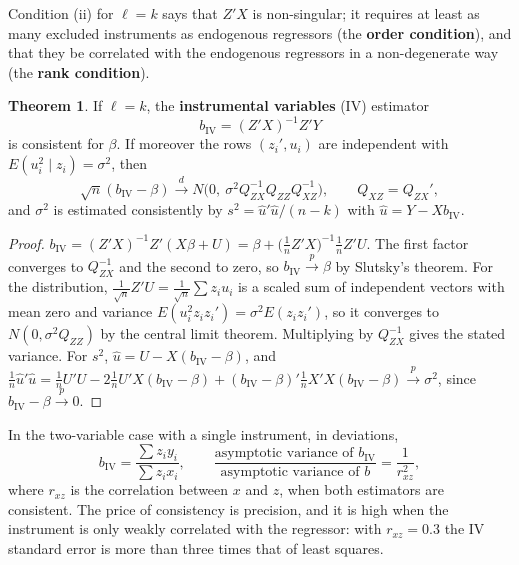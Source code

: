 \documentclass[11pt,a4paper]{article}
\numberwithin{equation}{section}
\theoremstyle{definition}
\newtheorem{thm}{Theorem}[subsection]
\begin{document}
Condition (ii) for $\ell = k$ says that $Z'X$ is non-singular; it requires at least as many excluded instruments as endogenous regressors (the
\textbf{order condition}), and that they be correlated with the endogenous regressors in a non-degenerate way (the \textbf{rank condition}).

\begin{thm}
\label{thm:ivest}
If $\ell = k$, the \textbf{instrumental variables} (IV) estimator
\[
b_{\text{IV}} = (Z'X)^{-1}Z'Y
\]
is consistent for $\beta$. If moreover the rows $(z_i', u_i)$ are independent with $E(u_i^2 \mid z_i) = \sigma^2$, then
\[
\sqrt n(b_{\text{IV}} - \beta) \xrightarrow{d} N\bigl(0,\ \sigma^2Q_{ZX}^{-1}Q_{ZZ}Q_{XZ}^{-1}\bigr), \qquad Q_{XZ} = Q_{ZX}' ,
\]
and $\sigma^2$ is estimated consistently by $s^2 = \hat u'\hat u/(n - k)$ with $\hat u = Y - Xb_{\text{IV}}$.
\end{thm}

\begin{proof}
$b_{\text{IV}} = (Z'X)^{-1}Z'(X\beta + U) = \beta + \bigl(\frac1nZ'X\bigr)^{-1}\frac1nZ'U$. The first factor converges to $Q_{ZX}^{-1}$ and the second to zero, so $b_{\text{IV}} \xrightarrow{p} \beta$
by Slutsky's theorem. For the distribution, $\frac{1}{\sqrt n}Z'U = \frac{1}{\sqrt n}\sum z_iu_i$ is a scaled sum of independent vectors with mean zero and variance
$E(u_i^2z_iz_i') = \sigma^2E(z_iz_i')$, so it converges to $N(0, \sigma^2Q_{ZZ})$ by the central limit theorem. Multiplying by $Q_{ZX}^{-1}$ gives the stated variance. For $s^2$,
$\hat u = U - X(b_{\text{IV}} - \beta)$, and $\frac1n\hat u'\hat u = \frac1nU'U - 2\frac1nU'X(b_{\text{IV}} - \beta) + (b_{\text{IV}} - \beta)'\frac1nX'X(b_{\text{IV}} - \beta) \xrightarrow{p} \sigma^2$, since $b_{\text{IV}} - \beta \xrightarrow{p} 0$.
\end{proof}

In the two-variable case with a single instrument, in deviations,
\[
b_{\text{IV}} = \frac{\sum z_iy_i}{\sum z_ix_i}, \qquad \frac{\text{asymptotic variance of } b_{\text{IV}}}{\text{asymptotic variance of } b} = \frac{1}{r_{xz}^2},
\]
where $r_{xz}$ is the correlation between $x$ and $z$, when both estimators are consistent. The price of consistency is precision, and it is high
when the instrument is only weakly correlated with the regressor: with $r_{xz} = 0.3$ the IV standard error is more than three times that of least
squares.
\end{document}
